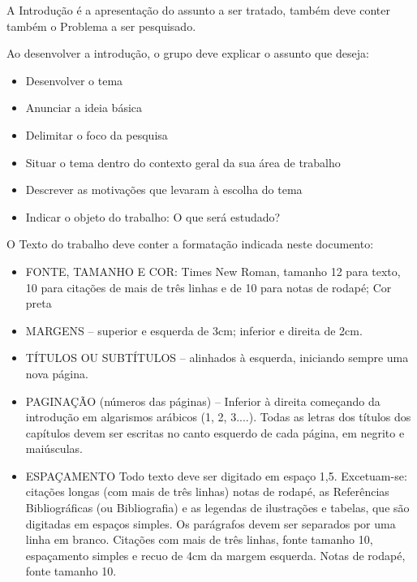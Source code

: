 A Introdução é a apresentação do assunto a ser tratado, também deve conter também
o Problema a ser pesquisado.

Ao desenvolver a introdução, o grupo deve explicar o assunto que deseja:

\begin{itemize}

\item Desenvolver o tema
\item Anunciar a ideia básica
\item Delimitar o foco da pesquisa
\item Situar o tema dentro do contexto geral da sua área de trabalho
\item Descrever as motivações que levaram à escolha do tema
\item Indicar o objeto do trabalho: O que será estudado?

\end{itemize}

O Texto do trabalho deve conter a formatação indicada neste documento:

\begin{itemize}

\item FONTE, TAMANHO E COR: Times New Roman, tamanho 12 para texto, 10 para
citações de mais de três linhas e de 10 para notas de rodapé; \textleftarrow Cor preta
\item MARGENS – superior e esquerda de 3cm; inferior e direita de 2cm.
\item TÍTULOS OU SUBTÍTULOS – alinhados à esquerda, iniciando sempre uma nova
página.
\item PAGINAÇÃO (números das páginas) – Inferior à direita começando da introdução
em algarismos arábicos (1, 2, 3....). Todas as letras dos títulos dos capítulos devem
ser escritas no canto esquerdo de cada página, em negrito e maiúsculas.
\item ESPAÇAMENTO \textleftarrow Todo texto deve ser digitado em espaço 1,5. \textleftarrow Excetuam-se:
citações longas (com mais de três linhas) notas de rodapé, as Referências
Bibliográficas (ou Bibliografia) e as legendas de ilustrações e tabelas, que são
digitadas em espaços simples. Os parágrafos devem ser separados por uma linha em
branco. Citações com mais de três linhas, fonte tamanho 10, espaçamento simples e
recuo de 4cm da margem esquerda. Notas de rodapé, fonte tamanho 10.

\end{itemize}
